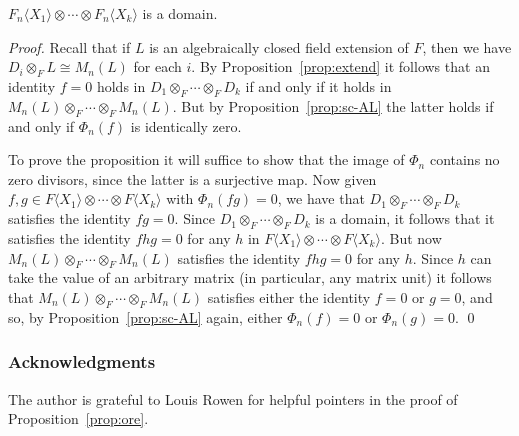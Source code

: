 \documentclass[runningheads]{llncs}
\begin{document}
\begin{proposition}
$F_n\langle X_1\rangle \otimes \cdots \otimes F_n\langle X_k\rangle$
  is a domain.
\label{prop:domain}
\end{proposition}
\begin{proof}
Recall that if $L$ is an algebraically closed field extension of $F$,
then we have $D_i \otimes_F L \cong M_n(L)$ for each $i$.  By
Proposition~\ref{prop:extend} it follows that an identity $f=0$ holds
in $D_1 \otimes_F \cdots \otimes_F D_k$ if and only if it holds in $M_n(L)
\otimes_F \cdots \otimes_F M_n(L)$.  But by
Proposition~\ref{prop:sc-AL} the latter holds if and only if
$\Phi_n(f)$ is identically zero.

To prove the proposition it will suffice to show that the image of
$\Phi_n$ contains no zero divisors, since the latter is a surjective map.
Now given $f,g \in F\langle X_1\rangle \otimes \cdots \otimes F\langle
X_k\rangle$ with $\Phi_n(fg)=0$, we have that $D_1 \otimes_F \cdots
\otimes_F D_k$ satisfies the identity $fg=0$.  Since $D_1 \otimes_F \cdots
\otimes_F D_k$ is a domain, it follows that it satisfies the identity
$fhg=0$ for any $h$ in $F\langle X_1\rangle \otimes \cdots \otimes
F\langle X_k\rangle$.  But now $M_n(L) \otimes_F \cdots \otimes_F
M_n(L)$ satisfies the identity $fhg=0$ for any $h$.  Since $h$ can
take the value of an arbitrary matrix (in particular, any matrix unit)
it follows that $M_n(L) \otimes_F \cdots \otimes_F M_n(L)$ satisfies
either the identity $f=0$ or $g=0$, and so, by
Proposition~\ref{prop:sc-AL} again, either $\Phi_n(f)=0$ or
$\Phi_n(g)=0$.  \qed
\end{proof}

\subsubsection{Acknowledgments}
The author is grateful to Louis Rowen for helpful pointers in the
proof of Proposition~\ref{prop:ore}.

 
\end{document}
